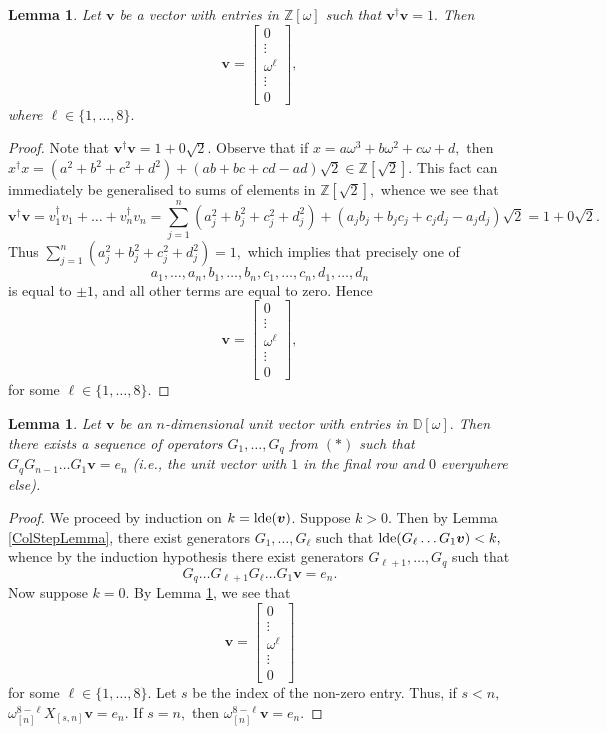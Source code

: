 \documentclass{dalthesis}
\theoremstyle{theorem}
\newtheorem{lemma}[theorem]{Lemma}
\theoremstyle{definition}
\theoremstyle{definition}  %
\theoremstyle{definition}
\newcommand{\Z}{\mathbb{Z}}
\newcommand{\D}{\mathbb{D}}
\renewcommand{\:}{\mathbin{:}}
\newcommand{\lde}{\mathop{\rm lde}\nolimits}
\begin{document}
\begin{lemma}
\label{SingleEntryLemma}
Let $\boldsymbol{v}$ be a vector with entries in $\Z[\omega]$ such that $\boldsymbol{v}^{\dagger}\boldsymbol{v} = 1.$ Then\[
\boldsymbol{v} = \left[\begin{array}{c}
0\\
\vdots\\
\omega^\ell\\
\vdots\\
0
\end{array} \right],
\]
where $\ell\in\{1,\ldots,8\}.$
\end{lemma}
\begin{proof}
Note that $\boldsymbol{v}^\dagger\boldsymbol{v} = 1 + 0\sqrt{2}.$ Observe that if $x = a\omega^3+b\omega^2+c\omega+d,$ then $x^\dagger x = (a^2+b^2+c^2+d^2)+(ab + bc + cd - ad)\sqrt{2}\in\Z[\sqrt{2}].$ This fact can immediately be generalised to sums of elements in $\Z[\sqrt{2}],$ whence we see that \[
\boldsymbol{v}^\dagger\boldsymbol{v} = v^\dagger_1v_1+\ldots+v^\dagger_nv_n = \sum^n_{j=1}(a_j^2+b_j^2+c_j^2 + d_j^2) + (a_jb_j+b_jc_j+c_jd_j-a_jd_j)\sqrt{2} = 1 + 0\sqrt{2}.
\]
Thus $\sum^n_{j=1}(a_j^2+b_j^2+c_j^2+d_j^2) = 1,$ which implies that precisely one of
\[a_1,\ldots, a_n,b_1,\ldots,b_n,c_1,\ldots,c_n,d_1,\ldots,d_n\] is equal to $\pm 1$, and all other terms are equal to zero. Hence \[
\boldsymbol{v} = \left[\begin{array}{c}
0\\
\vdots\\
\omega^\ell\\
\vdots\\
0
\end{array}\right],
\]for some $\ell\in\{1,\ldots,8\}.$
\end{proof}
\begin{lemma}
\label{ColumnLemma}
Let $\boldsymbol{v}$ be an $n$-dimensional unit vector with entries in $\D[\omega].$ Then there exists a sequence of operators $G_1,\ldots,G_q$ from $(*)$ such that $G_q G_{n-1}\ldots G_1\boldsymbol{v} = e_n$ (i.e., the unit vector with $1$ in the final row and $0$ everywhere else).
\end{lemma}
\begin{proof}
We proceed by induction on $k = \lde(\boldsymbol{v})$. Suppose $k > 0.$ Then by Lemma \ref{ColStepLemma}, there exist generators $G_1,\ldots,G_\ell$ such that $\lde(G_\ell\ldots G_1\boldsymbol{v}) < k,$ whence by the induction hypothesis there exist generators $G_{\ell+1},\ldots,G_q$ such that \[G_q\ldots G_{\ell+1}G_\ell\ldots G_1\boldsymbol{v} = e_n.\]
Now suppose $k = 0.$ By Lemma \ref{SingleEntryLemma}, we see that 
\[ \boldsymbol{v} = \left[\begin{array}{c}
0\\
\vdots\\
\omega^\ell\\
\vdots\\
0
\end{array}\right]
\]
for some $\ell\in\{1,\ldots ,8\}.$  Let $s$ be the index of the non-zero entry. Thus, if $s < n,$ $\omega^{8-\ell}_{[n]}X_{[s,n]}\boldsymbol{v} = e_n.$ If $s = n,$ then $\omega^{8-\ell}_{[n]}\boldsymbol{v} = e_n.$
\end{proof}
\end{document}
